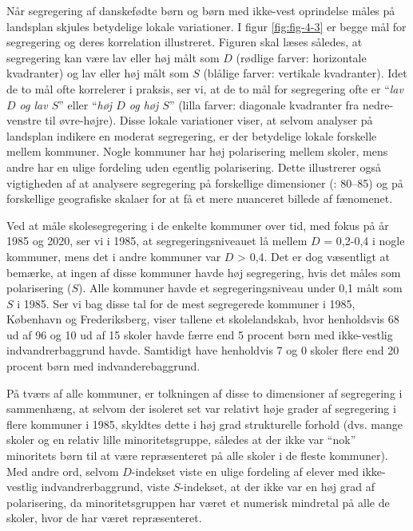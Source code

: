 \documentclass[
]{book}
\begin{document}
Når segregering af danskefødte børn og børn med ikke-vest oprindelse måles på landsplan skjules betydelige lokale variationer. I figur \ref{fig:fig-4-3} er begge mål for segregering og deres korrelation illustreret. Figuren skal læses således, at segregering kan være lav eller høj målt som \(D\) (rødlige farver: horizontale kvadranter) og lav eller høj målt som \(S\) (blålige farver: vertikale kvadranter). Idet de to mål ofte korrelerer i praksis, ser vi, at de to mål for segregering ofte er ``\emph{lav \(D\) og lav \(S\)}'' eller ``\emph{høj \(D\) og høj \(S\)}'' (lilla farver: diagonale kvadranter fra nedre-venstre til øvre-højre). Disse lokale variationer viser, at selvom analyser på landsplan indikere en moderat segregering, er der betydelige lokale forskelle mellem kommuner. Nogle kommuner har høj polarisering mellem skoler, mens andre har en ulige fordeling uden egentlig polarisering. Dette illustrerer også vigtigheden af at analysere segregering på forskellige dimensioner (: 80--85) og på forskellige geografiske skalaer for at få et mere nuanceret billede af fænomenet.

Ved at måle skolesegregering i de enkelte kommuner over tid, med fokus på år 1985 og 2020, ser vi i 1985, at segregeringsniveauet lå mellem \(D\) = 0,2-0,4 i nogle kommuner, mens det i andre kommuner var \(D\) \textgreater{} 0,4. Det er dog væsentligt at bemærke, at ingen af disse kommuner havde høj segregering, hvis det måles som polarisering (\(S\)). Alle kommuner havde et segregeringsniveau under 0,1 målt som \(S\) i 1985. Ser vi bag disse tal for de mest segregerede kommuner i 1985, København og Frederiksberg, viser tallene et skolelandskab, hvor henholdsvis 68 ud af 96 og 10 ud af 15 skoler havde færre end 5 procent børn med ikke-vestlig indvandrerbaggrund havde. Samtidigt have henholdvis 7 og 0 skoler flere end 20 procent børn med indvanderebaggrund.

På tværs af alle kommuner, er tolkningen af disse to dimensioner af segregering i sammenhæng, at selvom der isoleret set var relativt høje grader af segregering i flere kommuner i 1985, skyldtes dette i høj grad strukturelle forhold (dvs. mange skoler og en relativ lille minoritetsgruppe, således at der ikke var ``nok'' minoritets børn til at være repræsenteret på alle skoler i de fleste kommuner). Med andre ord, selvom \(D\)-indekset viste en ulige fordeling af elever med ikke-vestlig indvandrerbaggrund, viste \(S\)-indekset, at der ikke var en høj grad af polarisering, da minoritetsgruppen har været et numerisk mindretal på alle de skoler, hvor de har været repræsenteret.
\end{document}
